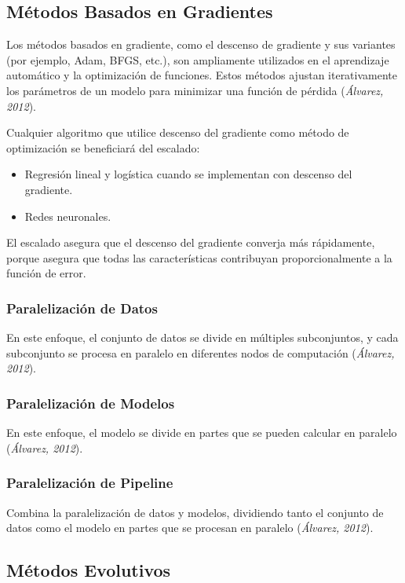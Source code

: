 	\subsection{Métodos Basados en Gradientes}
	
	Los métodos basados en gradiente, como el descenso de gradiente y sus variantes (por ejemplo, Adam, BFGS, etc.), son ampliamente utilizados en el aprendizaje automático y la optimización de funciones. Estos métodos ajustan iterativamente los parámetros de un modelo para minimizar una función de pérdida (\textit{Álvarez, 2012}).
	
	
	Cualquier algoritmo que utilice descenso del gradiente como método de optimización se beneficiará del escalado:
	
	\begin{itemize}
		\item Regresión lineal y logística cuando se implementan con descenso del gradiente.
		\item Redes neuronales.
	\end{itemize}
	
	El escalado asegura que el descenso del gradiente converja más rápidamente, porque asegura que todas las características contribuyan proporcionalmente a la función de error.
	
	\subsubsection{Paralelización de Datos}
	En este enfoque, el conjunto de datos se divide en múltiples subconjuntos, y cada subconjunto se procesa en paralelo en diferentes nodos de computación (\textit{Álvarez, 2012}).
	
	\subsubsection{Paralelización de Modelos}
	En este enfoque, el modelo se divide en partes que se pueden calcular en paralelo (\textit{Álvarez, 2012}).
	
	\subsubsection{Paralelización de Pipeline}
	Combina la paralelización de datos y modelos, dividiendo tanto el conjunto de datos como el modelo en partes que se procesan en paralelo (\textit{Álvarez, 2012}).
	
	\subsection{Métodos Evolutivos}
	
